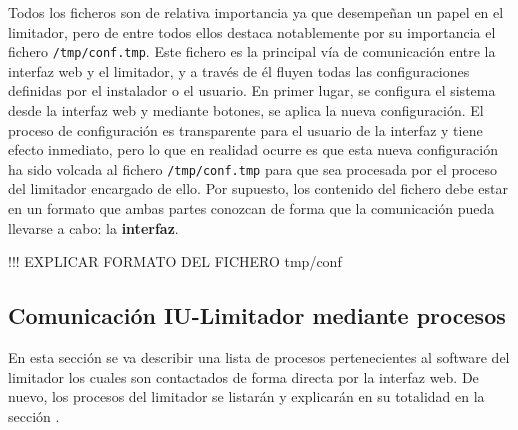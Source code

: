 Todos los ficheros son de relativa importancia ya que desempeñan un papel en el limitador, pero de entre todos ellos destaca notablemente por su importancia el fichero \verb|/tmp/conf.tmp|. Este fichero es la principal vía de comunicación entre la interfaz web y el limitador, y a través de él fluyen todas las configuraciones definidas por el instalador o el usuario. En primer lugar, se configura el sistema desde la interfaz web y mediante botones, se aplica la nueva configuración. El proceso de configuración es transparente para el usuario de la interfaz y tiene efecto inmediato, pero lo que en realidad ocurre es que esta nueva configuración ha sido volcada al fichero \verb|/tmp/conf.tmp| para que sea procesada por el proceso del limitador encargado de ello. Por supuesto, los contenido del fichero debe estar en un formato que ambas partes conozcan de forma que la comunicación pueda llevarse a cabo: la \textbf{interfaz}.

!!! EXPLICAR FORMATO DEL FICHERO tmp/conf

\subsection{Comunicación IU-Limitador mediante procesos} \label{sec:iu-limitador-procesos}

En esta sección se va describir una lista de procesos pertenecientes al software del limitador los cuales son contactados de forma directa por la interfaz web. De nuevo, los procesos del limitador se listarán y explicarán en su totalidad en la sección .

